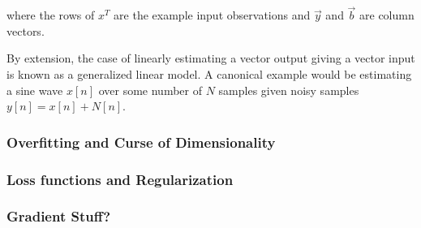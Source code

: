 where the rows of $x^{T}$ are the example input observations and $\vec{y}$ and $\vec{b}$ are column vectors.

By extension, the case of linearly estimating a vector output giving a vector input is known as a generalized linear model. A canonical example would be estimating a sine wave $x[n]$ over some number of $N$ samples given noisy samples $y[n]=x[n]+N[n]$.


\subsubsection{Overfitting and Curse of Dimensionality}


\subsubsection{Loss functions and Regularization}


\subsubsection{Gradient Stuff?}




